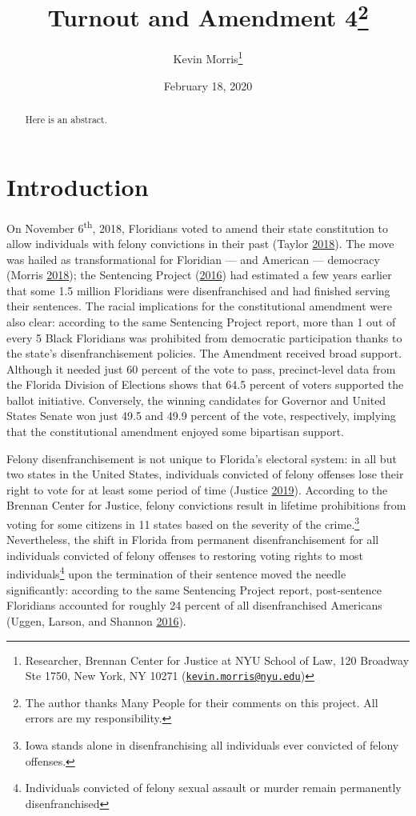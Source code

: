 \documentclass[
  12pt,
]{article}
\title{Turnout and Amendment 4\thanks{The author thanks Many People for their comments on this project. All errors are my responsibility.}}
\author{Kevin Morris\footnote{Researcher, Brennan Center for Justice at NYU School of Law, 120 Broadway Ste 1750, New York, NY 10271 (\href{mailto:kevin.morris@nyu.edu}{\nolinkurl{kevin.morris@nyu.edu}})}}
\date{February 18, 2020}
\begin{document}
\maketitle
\begin{abstract}
Here is an abstract.
\end{abstract}

\pagebreak


\hypertarget{introduction}{%
\section*{Introduction}\label{introduction}}

On November 6\textsuperscript{th}, 2018, Floridians voted to amend their state constitution to allow individuals with felony convictions in their past (Taylor \protect\hyperlink{ref-Taylor2018}{2018}). The move was hailed as transformational for Floridian --- and American --- democracy (Morris \protect\hyperlink{ref-Morris2018}{2018}); the Sentencing Project (\protect\hyperlink{ref-sentencing_2016}{2016}) had estimated a few years earlier that some 1.5 million Floridians were disenfranchised and had finished serving their sentences. The racial implications for the constitutional amendment were also clear: according to the same Sentencing Project report, more than 1 out of every 5 Black Floridians was prohibited from democratic participation thanks to the state's disenfranchisement policies. The Amendment received broad support. Although it needed just 60 percent of the vote to pass, precinct-level data from the Florida Division of Elections shows that 64.5 percent of voters supported the ballot initiative. Conversely, the winning candidates for Governor and United States Senate won just 49.5 and 49.9 percent of the vote, respectively, implying that the constitutional amendment enjoyed some bipartisan support.

Felony disenfranchisement is not unique to Florida's electoral system: in all but two states in the United States, individuals convicted of felony offenses lose their right to vote for at least some period of time (Justice \protect\hyperlink{ref-bcj_laws}{2019}). According to the Brennan Center for Justice, felony convictions result in lifetime prohibitions from voting for some citizens in 11 states based on the severity of the crime.\footnote{Iowa stands alone in disenfranchising all individuals ever convicted of felony offenses.} Nevertheless, the shift in Florida from permanent disenfranchisement for all individuals convicted of felony offenses to restoring voting rights to most individuals\footnote{Individuals convicted of felony sexual assault or murder remain permanently disenfranchised} upon the termination of their sentence moved the needle significantly: according to the same Sentencing Project report, post-sentence Floridians accounted for roughly 24 percent of all disenfranchised Americans (Uggen, Larson, and Shannon \protect\hyperlink{ref-sentencing_2016}{2016}).
\end{document}
